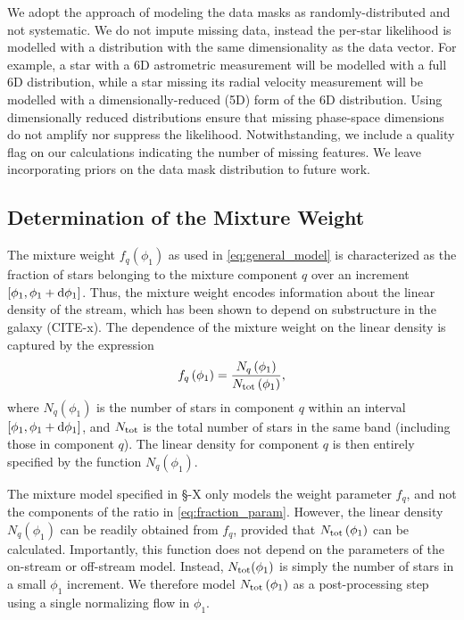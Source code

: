 \documentclass[twocolumn]{aastex631}
\begin{document}
        We adopt the approach of modeling the data masks as randomly-distributed
        and not systematic. We do not impute missing data, instead the per-star
        likelihood is modelled with a distribution with the same dimensionality
        as the data vector.  For example, a star with a 6D astrometric
        measurement will be modelled with a full 6D distribution, while a star
        missing its radial velocity measurement will be modelled with a
        dimensionally-reduced (5D) form of the 6D distribution. Using
        dimensionally reduced distributions ensure that missing phase-space
        dimensions do not amplify nor suppress the likelihood.  Notwithstanding,
        we include a quality flag on our calculations indicating the number of
        missing features.  We leave incorporating priors on the data mask
        distribution to future work. 


    \vspace{10pt}
    \subsection{Determination of the Mixture Weight} \label{sub:method:mixture_weight}

        The mixture weight $f_q(\phi_1)$ as used in \autoref{eq:general_model}
        is characterized as the fraction of stars belonging to the mixture
        component $q$ over an increment $[\phi_1, \phi_1 + \dif{\phi_1}]$. Thus,
        the mixture weight encodes information about the linear density of the
        stream, which has been shown to depend on substructure in the galaxy
        (CITE-x). The dependence of the mixture weight on the linear density is
        captured by the expression
        \begin{equation}\label{eq:fraction_param}
            f_q\left(\phi_1\right) = \frac{N_q\left(\phi_1\right)}{N_{\rm tot}\left(\phi_1\right)},
        \end{equation}
        where $N_q\left(\phi_1\right)$ is the number of stars in component $q$
        within an interval $[\phi_1, \phi_1 + \dif{\phi_1}]$, and $N_{\rm tot}$
        is the total number of stars in the same band (including those in
        component $q$). The linear  density for component $q$ is then entirely
        specified by the function $N_q(\phi_1)$.

        The mixture model specified in \S-X only models the weight parameter
        $f_q$, and not the components of the ratio in
        \autoref{eq:fraction_param}. However, the linear density $N_q(\phi_1)$
        can be readily obtained from $f_q$, provided that $N_{\rm
        tot}\left(\phi_1\right)$ can be calculated. Importantly, this function
        does not depend on the parameters of the on-stream or off-stream model.
        Instead, $N_{\rm tot}(\phi_1)$ is simply the number of stars in a small
        $\phi_1$ increment. We therefore model $N_{\rm tot}\left(\phi_1\right)$
        as a post-processing step using a single normalizing flow in $\phi_1$. 
\end{document}
